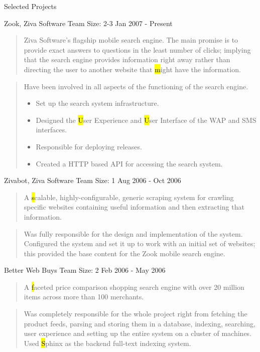 \documentclass{resume}
\newcommand{\teamsize}{\hfill\sc\footnotesize Team Size: }
\begin{document}
\begin{category}{Selected Projects}{}
    \pagebreak

    \item {\topic Zook,} Ziva Software
        {\teamsize 2-3}
        {\period Jan 2007 - Present}
        \begin{quote}
            Ziva Software's flagship mobile search engine. The main promise is
            to provide exact answers to questions in the least number of
            clicks; implying that the search engine provides information right
            away rather than directing the user to another website that {\hl
            might} have the information.
        \end{quote}
        \begin{quote}
            Have been involved in all aspects of the functioning of the search engine.
            \begin{itemize}
                \item Set up the search system infrastructure.
                \item Designed the {\hl User Experience} and {\hl User
                    Interface} of the WAP and SMS interfaces.
                \item Responsible for deploying releases.
                \item Created a HTTP based API for accessing the search system.
            \end{itemize}
        \end{quote}

    \item {\topic Zivabot,} Ziva Software
        {\teamsize 1}
        {\period Aug 2006 - Oct 2006}
        \begin{quote}
            A {\hl scalable, highly-configurable, generic scraping system} for
            crawling specific websites containing useful information and then
            extracting that information.
        \end{quote}
        \begin{quote}
            Was fully responsible for the design and implementation of the
            system. Configured the system and set it up to work with an initial
            set of websites; this provided the base content for the Zook mobile
            search engine.
        \end{quote}

    \item {\topic Better Web Buys}
        {\teamsize 2}
        {\period Feb 2006 - May 2006}
        \begin{quote}
            A {\hl faceted price comparison shopping search engine} with over
            20 million items across more than 100 merchants.
        \end{quote}
        \begin{quote}
            Was completely responsible for the whole project right from
            fetching the product feeds, parsing and storing them in a database,
            indexing, searching, user experience and setting up the entire
            system on a cluster of machines. Used {\hl Sphinx} as the backend
            full-text indexing system.
        \end{quote}


\end{category}
\end{document}
